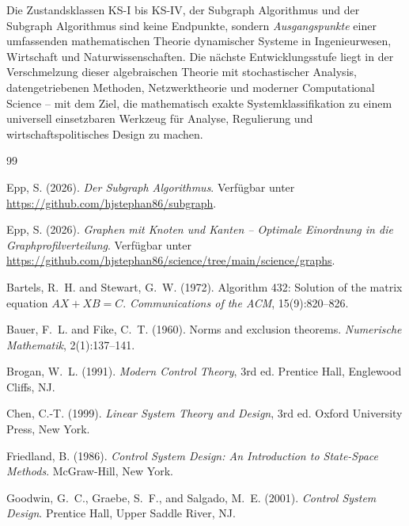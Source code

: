﻿\documentclass[12pt, a4paper, titlepage]{report}
\theoremstyle{definition}
\theoremstyle{remark}
\begin{document}
Die Zustandsklassen KS-I bis KS-IV, der Subgraph Algorithmus und der Subgraph Algorithmus
sind keine Endpunkte, sondern \emph{Ausgangspunkte} einer umfassenden mathematischen
Theorie dynamischer Systeme in Ingenieurwesen, Wirtschaft und Naturwissenschaften.
Die nächste Entwicklungsstufe liegt in der Verschmelzung dieser algebraischen Theorie
mit stochastischer Analysis, datengetriebenen Methoden, Netzwerktheorie und moderner
Computational Science -- mit dem Ziel, die mathematisch exakte Systemklassifikation
zu einem universell einsetzbaren Werkzeug für Analyse, Regulierung und
wirtschaftspolitisches Design zu machen.


\begin{thebibliography}{99}

Epp, S. (2026).
\newblock \textit{Der Subgraph Algorithmus}. Verfügbar unter \url{https://github.com/hjstephan86/subgraph}.

Epp, S. (2026).
\newblock \textit{Graphen mit Knoten und Kanten -- Optimale Einordnung in die
  Graphprofilverteilung}. Verfügbar unter \url{https://github.com/hjstephan86/science/tree/main/science/graphs}.

Bartels, R.~H. and Stewart, G.~W. (1972).
\newblock Algorithm 432: Solution of the matrix equation $AX + XB = C$.
\newblock \textit{Communications of the ACM}, 15(9):820--826.

Bauer, F.~L. and Fike, C.~T. (1960).
\newblock Norms and exclusion theorems.
\newblock \textit{Numerische Mathematik}, 2(1):137--141.

Brogan, W.~L. (1991).
\newblock \textit{Modern Control Theory}, 3rd ed.
\newblock Prentice Hall, Englewood Cliffs, NJ.

Chen, C.-T. (1999).
\newblock \textit{Linear System Theory and Design}, 3rd ed.
\newblock Oxford University Press, New York.

Friedland, B. (1986).
\newblock \textit{Control System Design: An Introduction to State-Space Methods}.
\newblock McGraw-Hill, New York.

Goodwin, G.~C., Graebe, S.~F., and Salgado, M.~E. (2001).
\newblock \textit{Control System Design}.
\newblock Prentice Hall, Upper Saddle River, NJ.


\end{thebibliography}
\end{document}

